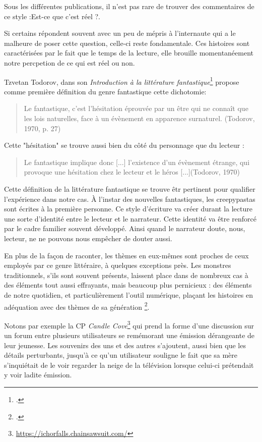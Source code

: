 \documentclass[12pt,a4paper,oneside,titlepage]{book} %
\begin{document}
Sous les différentes publications, il n'est pas rare de trouver des commentaires de ce style :\og Est-ce que c'est réel ?\fg{}.

Si certains répondent souvent avec un peu de mépris à l'internaute qui a le malheure de poser cette question, celle-ci reste fondamentale. Ces histoires sont caractérisées par le fait que le temps de la lecture, elle brouille momentanéement notre percpetion de ce qui est réel ou non.

Tzvetan Todorov, dans son \emph{Introduction à la littérature fantastique}\footcite{todorov_introduction_1992} propose comme première définition du genre fantastique cette dichotomie: 

	\begin{quotation}
Le fantastique, c’est l’hésitation éprouvée par un être qui ne connaît que les lois naturelles, face à un évènement en apparence surnaturel. (Todorov, 1970, p. 27)\newline
	\end{quotation}

Cette "hésitation" se trouve aussi bien du côté du personnage que du lecteur : 
\begin{quotation}
	Le fantastique implique donc [...] l’existence d’un évènement étrange, qui provoque une hésitation chez le lecteur et le héros [...](Todorov, 1970)
\end{quotation}

Cette définition de la littérature fantastique se trouve êtr pertinent pour qualifier l'expérience dans notre cas. À l'instar des nouvelles fantastiques, les creepypastas sont écrites à la première personne. Ce style d'écriture va créer durant la lecture une sorte d'identité entre le lecteur et le narrateur. Cette identité va être renforcé par le cadre familier souvent développé. Ainsi quand le narrateur doute, nous, lecteur, ne ne pouvons nous empêcher de douter aussi. 
\par
En plus de la façon de raconter, les thèmes en eux-mêmes sont proches de ceux employés par ce genre littéraire, à quelques exceptions près. Les monstres traditionnels, s’ils sont souvent présents, laissent place dans de nombreux cas à des éléments tout aussi effrayants, mais beaucoup plus pernicieux : des éléments de notre quotidien, et particulièrement l’outil numérique, plaçant les histoires en adéquation avec des thèmes de sa génération \footcite{king_anatomie_2020}.
\par
Notons par exemple la CP \emph{Candle Cove}\footnote{\url{https://ichorfalls.chainsawsuit.com/}} qui prend la forme d’une discussion sur un forum entre plusieurs utilisateurs se remémorant une émission dérangeante de leur jeunesse. Les souvenirs des uns et des autres s’ajoutent, aussi bien que les détails perturbants, jusqu’à ce qu’un utilisateur souligne le fait que sa mère s’inquiétait de le voir regarder la neige de la télévision lorsque celui-ci prétendait y voir ladite émission. 
\end{document}
